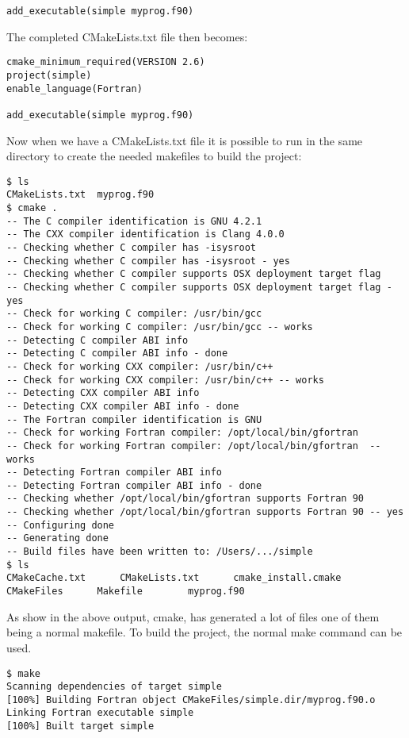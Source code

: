 \begin{lstlisting}
add_executable(simple myprog.f90)
\end{lstlisting}

The completed CMakeLists.txt file then becomes:

\begin{lstlisting}
cmake_minimum_required(VERSION 2.6)
project(simple)
enable_language(Fortran)

add_executable(simple myprog.f90)
\end{lstlisting}

Now when we have a CMakeLists.txt file it is possible to run  in the same directory to create the needed makefiles to build the project:

\cmdmode

\begin{lstlisting}
$ ls
CMakeLists.txt	myprog.f90
$ cmake .
-- The C compiler identification is GNU 4.2.1
-- The CXX compiler identification is Clang 4.0.0
-- Checking whether C compiler has -isysroot
-- Checking whether C compiler has -isysroot - yes
-- Checking whether C compiler supports OSX deployment target flag
-- Checking whether C compiler supports OSX deployment target flag - yes
-- Check for working C compiler: /usr/bin/gcc
-- Check for working C compiler: /usr/bin/gcc -- works
-- Detecting C compiler ABI info
-- Detecting C compiler ABI info - done
-- Check for working CXX compiler: /usr/bin/c++
-- Check for working CXX compiler: /usr/bin/c++ -- works
-- Detecting CXX compiler ABI info
-- Detecting CXX compiler ABI info - done
-- The Fortran compiler identification is GNU
-- Check for working Fortran compiler: /opt/local/bin/gfortran
-- Check for working Fortran compiler: /opt/local/bin/gfortran  -- works
-- Detecting Fortran compiler ABI info
-- Detecting Fortran compiler ABI info - done
-- Checking whether /opt/local/bin/gfortran supports Fortran 90
-- Checking whether /opt/local/bin/gfortran supports Fortran 90 -- yes
-- Configuring done
-- Generating done
-- Build files have been written to: /Users/.../simple
$ ls
CMakeCache.txt		CMakeLists.txt		cmake_install.cmake
CMakeFiles		Makefile		myprog.f90
\end{lstlisting}

As show in the above output, cmake, has generated a lot of files one of them being a normal makefile. To build the project, the normal make command can be used.

\begin{lstlisting}
$ make
Scanning dependencies of target simple
[100%] Building Fortran object CMakeFiles/simple.dir/myprog.f90.o
Linking Fortran executable simple
[100%] Built target simple
\end{lstlisting}

